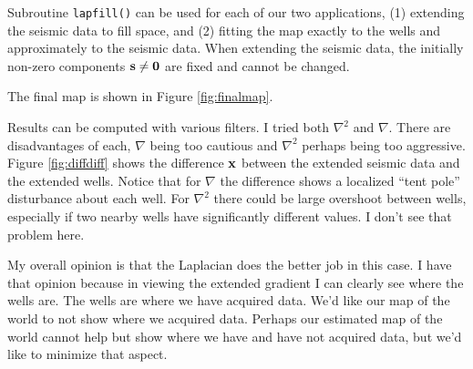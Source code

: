 
\par
Subroutine \texttt{lapfill()}
can be used for each of our two applications,
(1) extending the seismic data to fill space, and
(2) fitting the map exactly to the wells and approximately to the seismic data.
When extending the seismic data,
the initially non-zero components $\bold s \ne \bold 0$ are fixed
and cannot be changed.
\begin{comment}
That is done by calling
\texttt{lapfill()} with \texttt{mfixed=(s/=0.)}.
When extending wells,
the initially non-zero components $\bold w \ne \bold 0$ are fixed
and cannot be changed.
That is done by calling
\texttt{lapfill()} with \texttt{mfixed=(w/=0.)}.
\end{comment}

\par
The final map is shown in Figure \ref{fig:finalmap}.

\par
Results can be computed with various filters.
I tried both $\nabla^2$ and $\nabla$.
There are disadvantages of each,
$\nabla$ being too cautious and
$\nabla^2$ perhaps being too aggressive.
Figure \ref{fig:diffdiff} shows the difference $\bold x$ between
the extended seismic data and the extended wells.
Notice that for $\nabla$ the difference shows
a localized ``tent pole'' disturbance about each well.
For $\nabla^2$ there could be large overshoot between wells,
especially if two nearby wells have significantly different values.
I don't see that problem here.
\par
My overall opinion is that the Laplacian does the better job in this case.
I have that opinion because in viewing the extended gradient
I can clearly see where the wells are.
The wells are where we have acquired data.
We'd like our map of the world to not show where we acquired data.
Perhaps our estimated map of the world cannot help but show where
we have and have not acquired data, but we'd like to minimize that aspect.
\par
{}



